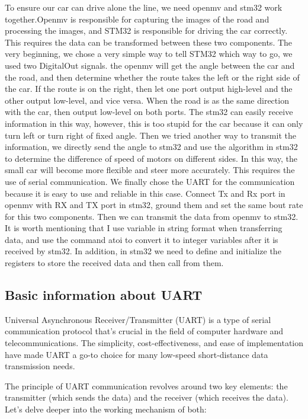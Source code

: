 \documentclass[12pt, a4paper, oneside]{report}
\begin{document}
To ensure our car can drive alone the line, we need openmv and stm32 work together.Openmv is responsible for capturing the images of the road and processing the images, and STM32 is responsible for driving the car correctly. This requires the data can be transformed between these two components. The very beginning, we chose a very simple way to tell STM32 which way to go, we used two DigitalOut signals. the openmv will get the angle between the car and the road, and then determine whether the route takes the left or the right side of the car. If the route is on the right, then let one port output high-level and the other output low-level, and vice versa. When the road is as the same direction with the car, then output low-level on both ports. The stm32 can easily receive information in this way, however, this is too stupid for the car because it can only turn left or turn right of fixed angle. Then we tried another way to transmit the information, we directly send the angle to stm32 and use the algorithm in stm32 to determine the difference of speed of motors on different sides. In this way, the small car will become more flexible and steer more accurately. This requires the use of serial communication. We finally chose the UART for the communication because it is easy to use and reliable in this case. Connect Tx and Rx port in openmv with RX and TX port in stm32, ground them and set the same bout rate for this two components. Then we can transmit the data from openmv to stm32. It is worth mentioning that I use variable in string format when transferring data, and use the command atoi to convert it to integer variables after it is received by stm32. In addition, in stm32 we need to define and initialize the registers to store the received data and then call from them.

\subsection{Basic information about UART}
Universal Asynchronous Receiver/Transmitter (UART) is a type of serial communication protocol that's crucial in the field of computer hardware and telecommunications. The simplicity, cost-effectiveness, and ease of implementation have made UART a go-to choice for many low-speed short-distance data transmission needs.

The principle of UART communication revolves around two key elements: the transmitter (which sends the data) and the receiver (which receives the data). Let's delve deeper into the working mechanism of both:
\end{document}
